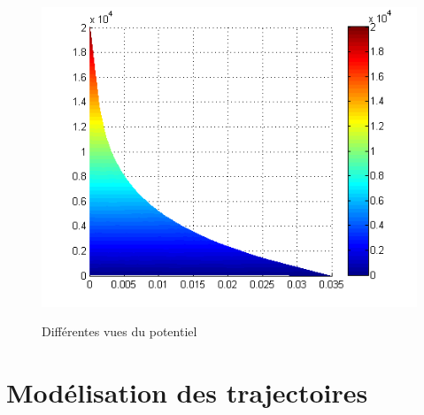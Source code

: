 \documentclass[a4paper,12pt]{article}
\begin{document}
\begin{figure}[h]
\begin{minipage}[c]{.32\linewidth}
      \label{f v_xy}
   \end{minipage} \hfill
   \begin{minipage}[c]{.32\linewidth}
      \includegraphics[width=1\textwidth,height=0.8\textwidth]{images/v_yz}
      \label{f v_yz}
   \end{minipage}
   \caption{Différentes vues du potentiel}
   \label{f v}
\end{figure}






\section{Modélisation des trajectoires}
\end{document}
